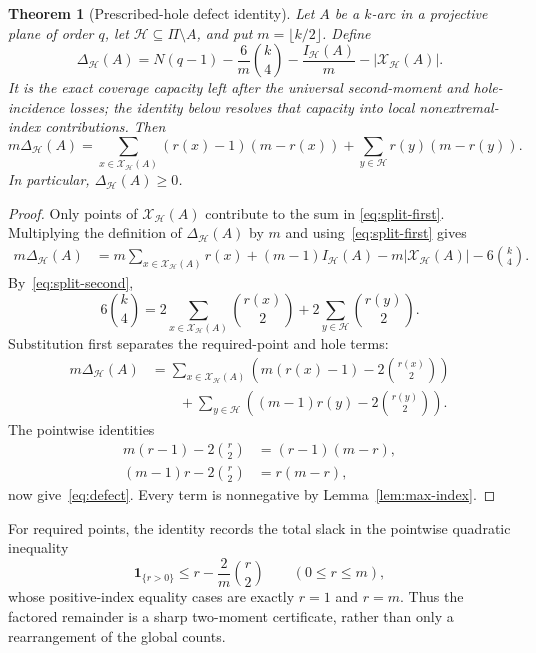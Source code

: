 \documentclass[11pt]{article}
\newtheorem{theorem}{Theorem}[section]
\theoremstyle{definition}
\theoremstyle{remark}
\newcommand{\cH}{\mathcal{H}}
\newcommand{\cX}{\mathcal{X}}
\newcommand{\IH}{I_{\cH}}
\begin{document}
\begin{theorem}[Prescribed-hole defect identity]
\label{thm:defect}
Let $A$ be a $k$-arc in a projective plane of order $q$, let
$\cH\subseteq\Pi\setminus A$, and put $m=\lfloor k/2\rfloor$.  Define
\[
 \Delta_{\cH}(A)=
 N(q-1)-\frac{6}{m}\binom{k}{4}
 -\frac{\IH(A)}{m}-|\cX_{\cH}(A)|.
\]
It is the exact coverage capacity left after the universal second-moment and
hole-incidence losses; the identity below resolves that capacity into local
nonextremal-index contributions.
Then
\begin{equation}
\boxed{
 m\Delta_{\cH}(A)=
 \sum_{x\in\cX_{\cH}(A)}(r(x)-1)(m-r(x))
 +\sum_{y\in\cH}r(y)(m-r(y)).
}
\label{eq:defect}
\end{equation}
In particular, $\Delta_{\cH}(A)\ge0$.
\end{theorem}

\begin{proof}
Only points of $\cX_{\cH}(A)$ contribute to the sum in
\eqref{eq:split-first}.  Multiplying the definition of $\Delta_{\cH}(A)$
by $m$ and using~\eqref{eq:split-first} gives
\begin{align*}
 m\Delta_{\cH}(A)
 &=m\sum_{x\in\cX_{\cH}(A)}r(x)
   +(m-1)\IH(A)-m|\cX_{\cH}(A)|
   -6\binom{k}{4}.
\end{align*}
By~\eqref{eq:split-second},
\[
 6\binom{k}{4}=
 2\sum_{x\in\cX_{\cH}(A)}\binom{r(x)}2
 +2\sum_{y\in\cH}\binom{r(y)}2.
\]
Substitution first separates the required-point and hole terms:
\begin{align*}
m\Delta_{\cH}(A)
&=\sum_{x\in\cX_{\cH}(A)}
  \left(m(r(x)-1)-2\binom{r(x)}2\right)\\
&\qquad+\sum_{y\in\cH}
  \left((m-1)r(y)-2\binom{r(y)}2\right).
\end{align*}
The pointwise identities
\begin{align*}
 m(r-1)-2\binom r2&=(r-1)(m-r),\\
 (m-1)r-2\binom r2&=r(m-r),
\end{align*}
now give~\eqref{eq:defect}.  Every term is nonnegative by
Lemma~\ref{lem:max-index}.
\end{proof}

For required points, the identity records the total slack in the
pointwise quadratic inequality
\[
 \mathbf 1_{\{r>0\}}\le r-\frac2m\binom r2
 \qquad(0\le r\le m),
\]
whose positive-index equality cases are exactly \(r=1\) and \(r=m\).
Thus the factored remainder is a sharp two-moment certificate, rather than
only a rearrangement of the global counts.
\end{document}
